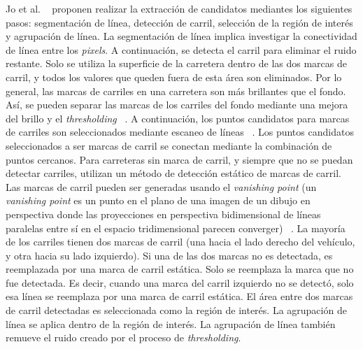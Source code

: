 		Jo et al. ~ proponen realizar la extracción de candidatos mediantes los siguientes pasos: segmentación
		de línea, detección de carril, selección de la región de interés y agrupación de línea. La segmentación de línea implica investigar la conectividad 
		de línea entre los \emph{pixels}. A continuación, se detecta el carril para eliminar el ruido restante. Solo se utiliza la superficie de la carretera dentro de las dos marcas de 
		carril, y todos los valores que queden fuera de esta área son eliminados. Por lo general, las marcas de carriles en una carretera son más brillantes que el fondo.
		Así, se pueden separar las marcas de los carriles del fondo mediante una  mejora del brillo y el \emph{thresholding} ~. A continuación, los 
		puntos candidatos para marcas de carriles son seleccionados mediante escaneo de líneas ~. Los puntos candidatos seleccionados a ser marcas de carril 
		se conectan mediante la combinación de puntos cercanos. Para carreteras sin marca de carril, y siempre que no se puedan detectar carriles, utilizan 
		un método de detección estático de marcas de carril. Las marcas de carril pueden ser generadas usando el \emph{vanishing point} (un \emph{vanishing point} es un punto 
		en el plano de una imagen de un dibujo en perspectiva donde las proyecciones en perspectiva bidimensional de líneas paralelas entre sí en el espacio 
		tridimensional parecen converger) ~. La mayoría de los carriles tienen dos marcas de carril (una hacia el lado derecho 
		del vehículo, y otra hacia su lado izquierdo). Si una de las dos marcas no es detectada, es reemplazada por una marca de carril estática. Solo 
		se reemplaza la marca que no fue detectada. Es decir, cuando una marca del carril izquierdo no se detectó, solo esa línea se reemplaza por una marca 
		de carril estática. El área entre dos marcas de carril detectadas es seleccionada como la región de interés. La agrupación 
		de línea se aplica dentro de la región de interés. La agrupación de línea también remueve el ruido creado por el proceso de \emph{thresholding}.

